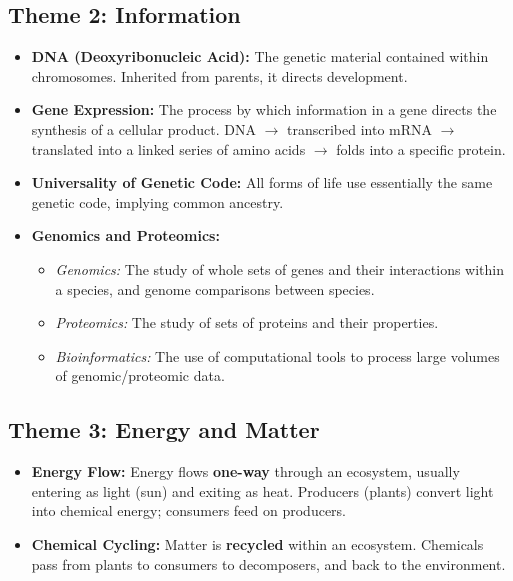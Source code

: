 \documentclass[11pt, a4paper]{article}
\begin{document}
\subsection*{Theme 2: Information}
\begin{itemize}
    \item \textbf{DNA (Deoxyribonucleic Acid):} The genetic material contained within chromosomes. Inherited from parents, it directs development.
    \item \textbf{Gene Expression:} The process by which information in a gene directs the synthesis of a cellular product. DNA $\rightarrow$ transcribed into mRNA $\rightarrow$ translated into a linked series of amino acids $\rightarrow$ folds into a specific protein.
    \item \textbf{Universality of Genetic Code:} All forms of life use essentially the same genetic code, implying common ancestry.
    \item \textbf{Genomics and Proteomics:} 
    \begin{itemize}
        \item \textit{Genomics:} The study of whole sets of genes and their interactions within a species, and genome comparisons between species.
        \item \textit{Proteomics:} The study of sets of proteins and their properties.
        \item \textit{Bioinformatics:} The use of computational tools to process large volumes of genomic/proteomic data.
    \end{itemize}
\end{itemize}

\subsection*{Theme 3: Energy and Matter}
\begin{itemize}
    \item \textbf{Energy Flow:} Energy flows \textbf{one-way} through an ecosystem, usually entering as light (sun) and exiting as heat. Producers (plants) convert light into chemical energy; consumers feed on producers.
    \item \textbf{Chemical Cycling:} Matter is \textbf{recycled} within an ecosystem. Chemicals pass from plants to consumers to decomposers, and back to the environment.
\end{itemize}
\end{document}
